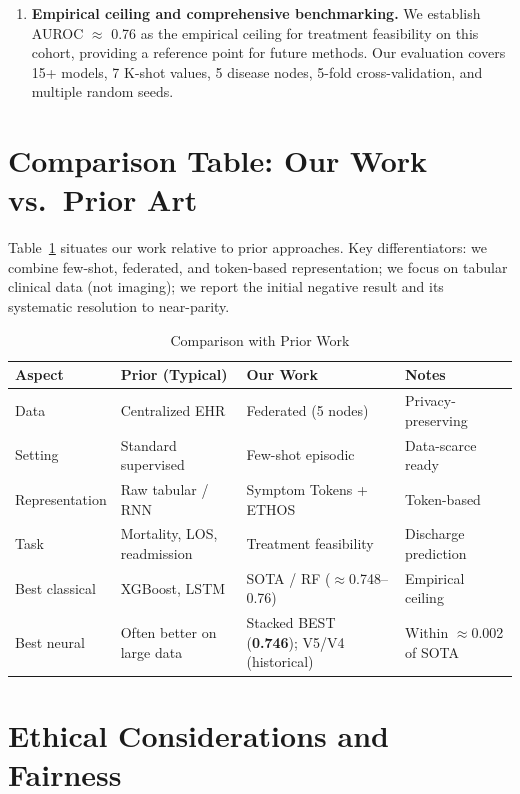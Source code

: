 \begin{enumerate}
\item \textbf{Empirical ceiling and comprehensive benchmarking.} We establish AUROC $\approx$ 0.76 as the empirical ceiling for treatment feasibility on this cohort, providing a reference point for future methods. Our evaluation covers 15+ models, 7 K-shot values, 5 disease nodes, 5-fold cross-validation, and multiple random seeds.
\end{enumerate}

\section{Comparison Table: Our Work vs.\ Prior Art}

Table~\ref{tab:comparison_prior} situates our work relative to prior approaches. Key differentiators: we combine few-shot, federated, and token-based representation; we focus on tabular clinical data (not imaging); we report the initial negative result and its systematic resolution to near-parity.

\begin{table}[htbp]
\centering
\caption{Comparison with Prior Work}
\begin{tabular}{p{2.2cm}p{2.5cm}p{2.5cm}p{3.5cm}}
\toprule
\textbf{Aspect} & \textbf{Prior (Typical)} & \textbf{Our Work} & \textbf{Notes} \\
\midrule
Data & Centralized EHR & Federated (5 nodes) & Privacy-preserving \\
Setting & Standard supervised & Few-shot episodic & Data-scarce ready \\
Representation & Raw tabular / RNN & Symptom Tokens + ETHOS & Token-based \\
Task & Mortality, LOS, readmission & Treatment feasibility & Discharge prediction \\
Best classical & XGBoost, LSTM & SOTA / RF ($\approx$0.748--0.76) & Empirical ceiling \\
Best neural & Often better on large data & Stacked BEST (\textbf{0.746}); V5/V4 (historical) & Within $\approx$0.002 of SOTA \\
\bottomrule
\end{tabular}
\label{tab:comparison_prior}
\end{table}

\section{Ethical Considerations and Fairness}

